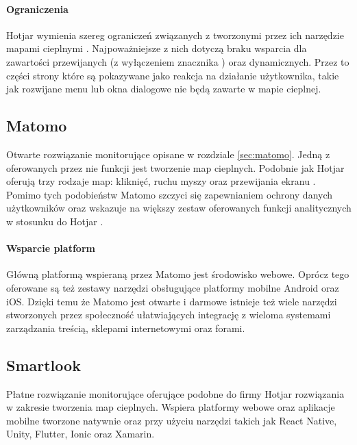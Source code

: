 \paragraph{Ograniczenia} 
Hotjar wymienia szereg ograniczeń związanych z tworzonymi przez ich narzędzie mapami cieplnymi \cite{Hotjar_limitations}. Najpoważniejsze z nich dotyczą braku wsparcia dla zawartości przewijanych (z wyłączeniem znacznika ) oraz  dynamicznych. Przez to części strony które są pokazywane jako reakcja na działanie użytkownika, takie jak rozwijane menu lub okna dialogowe nie będą zawarte w mapie cieplnej.

\subsection{Matomo}
Otwarte rozwiązanie monitorujące opisane w rozdziale \ref{sec:matomo}. Jedną z oferowanych przez nie funkcji jest tworzenie map cieplnych. Podobnie jak Hotjar oferują trzy rodzaje map: kliknięć, ruchu myszy oraz przewijania ekranu \cite{Matomo_heatmaps}. Pomimo tych podobieństw Matomo szczyci się zapewnianiem ochrony danych użytkowników oraz wskazuje na większy zestaw oferowanych funkcji analitycznych w stosunku do Hotjar \cite{Matomo_hotjar}.

\paragraph{Wsparcie platform} 
Główną platformą wspieraną przez Matomo jest środowisko webowe. Oprócz tego oferowane są też zestawy narzędzi obsługujące platformy mobilne Android oraz iOS. Dzięki temu że Matomo jest otwarte i darmowe istnieje też wiele narzędzi stworzonych przez społeczność ułatwiających integrację z wieloma systemami zarządzania treścią, sklepami internetowymi oraz forami.

\subsection{Smartlook}
Płatne rozwiązanie monitorujące oferujące podobne do firmy Hotjar rozwiązania w zakresie tworzenia map cieplnych. Wspiera platformy webowe oraz aplikacje mobilne tworzone natywnie oraz przy użyciu narzędzi takich jak React Native, Unity, Flutter, Ionic oraz Xamarin.
